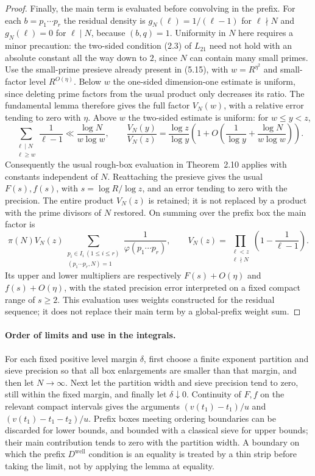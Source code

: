 \begin{proof}
Finally, the main term is evaluated before convolving in the prefix.
For each $b=p_1\cdots p_r$ the residual density is
$g_N(\ell)=1/(\ell-1)$ for $\ell\nmid N$ and $g_N(\ell)=0$
for $\ell\mid N$, because $(b,q)=1$. Uniformity in $N$ here
requires a minor precaution: the two-sided condition (2.3) of
$L_{21}$ need not hold with an absolute constant all the way down
to $2$, since $N$ can contain many small primes.
Use the small-prime presieve already present in (5.15), with
$w=R^{\eta^2}$ and small-factor level $R^{O(\eta)}$.
Below $w$ the one-sided dimension-one estimate is uniform, since
deleting prime factors from the usual product only decreases its
ratio. The fundamental lemma therefore gives the full factor
$V_N(w)$, with a relative error tending to zero with $\eta$.
Above $w$ the two-sided estimate is uniform: for $w\le y<z$,
\[
 \sum_{\substack{\ell\mid N\\\ell\ge w}}
       \frac1{\ell-1}
 \ll\frac{\log N}{w\log w},\qquad
 \frac{V_N(y)}{V_N(z)}
 =\frac{\log z}{\log y}
   \left(1+O\!\left(\frac1{\log y}
                    +\frac{\log N}{w\log w}\right)\right).
\]
Consequently the usual rough-box evaluation in Theorem~2.10
applies with constants independent of $N$. Reattaching the
presieve gives the usual $F(s),f(s)$, with
$s=\log R/\log z$, and an error tending to zero with the precision.
The entire product $V_N(z)$ is retained; it is not replaced by a
product with the prime divisors of $N$ restored. On summing over
the prefix box the main factor is
\[
 \pi(N)V_N(z)
 \sum_{\substack{p_i\in I_i\ (1\le i\le r)\\(p_1\cdots p_r,N)=1}}
       \frac1{\varphi(p_1\cdots p_r)},
 \qquad
 V_N(z)=\prod_{\substack{\ell<z\\\ell\nmid N}}
       \left(1-\frac1{\ell-1}\right).
\]
Its upper and lower multipliers are respectively
$F(s)+O(\eta)$ and $f(s)+O(\eta)$, with the stated precision
error interpreted on a fixed compact range of $s\ge2$.
This evaluation uses weights constructed for the residual sequence;
it does not replace their main term by a global-prefix weight sum.
\end{proof}

\paragraph{Order of limits and use in the integrals.}
For each fixed positive level margin $\delta$, first choose a finite
exponent partition and sieve precision so that all box enlargements
are smaller than that margin, and then let $N\to\infty$.
Next let the partition width and sieve precision tend to zero,
still within the fixed margin, and finally let $\delta\downarrow0$.
Continuity of $F,f$ on the relevant compact intervals gives the
arguments $(v(t_1)-t_1)/u$ and
$(v(t_1)-t_1-t_2)/u$. Prefix boxes meeting ordering boundaries
can be discarded for lower bounds, and bounded with a classical
sieve for upper bounds; their main contribution tends to zero with
the partition width. A boundary on which the prefix
$D^{\mathrm{well}}$ condition is an equality is treated by a thin
strip before taking the limit, not by applying the lemma at equality.


